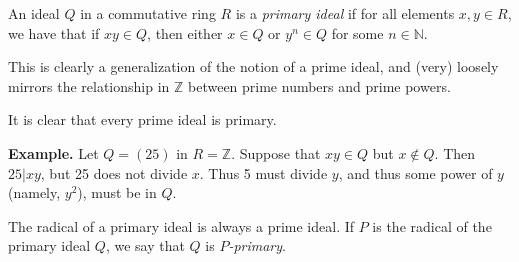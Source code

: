 \documentclass[12pt]{article}
\newcommand{\mb}{\mathbb}
\newcommand{\<}{\langle}
\renewcommand{\>}{\rangle}
\begin{document}
An ideal $Q$ in a commutative ring $R$ is a \emph{primary ideal} if for all elements $x,y\in R$, we have that if $xy\in Q$, then either $x\in Q$ or $y^n\in Q$ for some $n\in\mb{N}$.

This is clearly a generalization of the notion of a prime ideal, and (very) loosely mirrors the relationship in $\mb{Z}$ between prime numbers and prime powers.

It is clear that every prime ideal is primary.

\textbf{Example.}  Let $Q=(25)$ in $R=\mb{Z}$.  Suppose that $xy\in Q$ but $x\notin Q$.  Then $25|xy$, but 25 does not divide $x$.  Thus 5 must divide $y$, and thus some power of $y$ (namely, $y^2$), must be in $Q$.

The radical of a primary ideal is always a prime ideal.  If $P$ is the radical of the primary ideal $Q$, we say that $Q$ is \emph{$P$-primary}.

\end{document}
